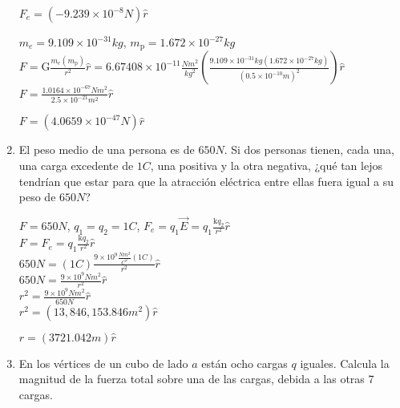 \documentclass[10pt, a4paper]{article}
\begin{document}
\begin{enumerate}
\begin{center}
            $F_e= (-9.239\times 10^{-8}\si{N})\hat{r}$

            $m_e=9.109\times 10^{-31}\si{kg}$, $m_{\mathrm{p}}=1.672\times 10^{-27}\si{kg}$\\
            $F=\mathrm{G}\frac{m_e(m_{\mathrm{p}})}{r^2}\hat{r}=6.67408\times 10^{-11}\frac{\si{N}\si{m}^2}{\si{kg}^2}(\frac{9.109\times 10^{-31}\si{kg}(1.672\times 10^{-27}\si{kg})}{(0.5\times 10^{-10}\si{m})^2})\hat{r}$\\
            $F=\frac{1.0164\times 10^{-67}\si{N}\si{m}^2}{2.5\times 10^{-21}\si{m}^2}\hat{r}$

            $F=(4.0659\times 10^{-47}\si{N})\hat{r}$

        \end{center}

        \item El peso medio de una persona es de $650 \si{N}$. Si dos personas tienen, cada una, una carga excedente
         de $1 \si{C}$, una positiva y la otra negativa, ¿qué tan lejos tendrían que estar para que la atracción eléctrica
        entre ellas fuera igual a su peso de $650 N$?

        \begin{center}
            $F = 650 \si{N}$, $q_1=q_2=1 \si{C}$, $F_e=q_1\vec{E}=q_1\frac{\mathrm{k}q_2}{r^2}\hat{r}$\\
            $F = F_e = q_1\frac{\mathrm{k}q_2}{r^2}\hat{r}$\\
            $650\si{N}= (1\si{C})\frac{9\times 10^9 \frac{\si{N}\si{m}^2}{\si{C}^2}(1\si{C})}{r^2}\hat{r}$\\
            $650\si{N}=\frac{9\times 10^9 \si{N}\si{m}^2}{r^2} \hat{r}$\\
            $r^2=\frac{9\times 10^9\si{N}\si{m}^2}{650\si{N}}\hat{r}$\\
            $r^2=(13,846,153.846\si{m}^2)\hat{r}$

            $r=(3721.042\si{m})\hat{r}$
        \end{center}

        \item En los vértices de un cubo de lado $a$ están ocho cargas $q$ iguales. Calcula la magnitud de la 
        fuerza total sobre una de las cargas, debida a las otras 7 cargas.


\end{enumerate}
\end{document}
